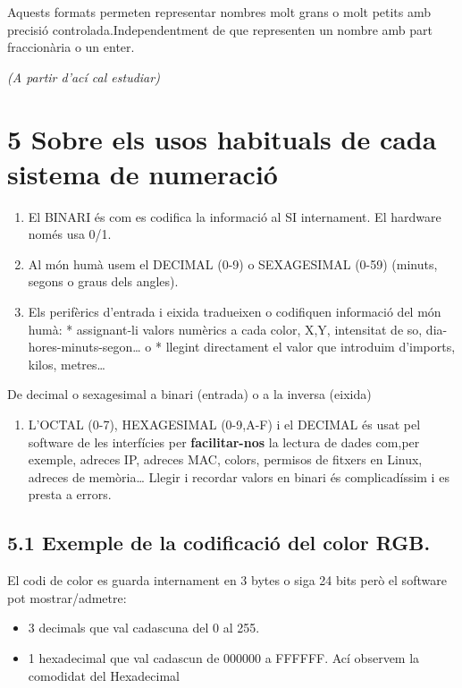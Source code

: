 \documentclass[
  12 pt,
  a4paper,
]{article}
\providecommand{\tightlist}{%
  \setlength{\itemsep}{0pt}\setlength{\parskip}{0pt}}
\begin{document}
Aquests formats permeten representar nombres molt grans o molt petits
amb precisió controlada.Independentment de que representen un nombre amb
part fraccionària o un enter.

\emph{(A partir d'ací cal estudiar)}

\section{5 Sobre els usos habituals de cada sistema de
numeració}\label{sobre-els-usos-habituals-de-cada-sistema-de-numeraciuxf3}

\begin{enumerate}
\def\labelenumi{\arabic{enumi}.}
\item
  El BINARI és com es codifica la informació al SI internament. El
  hardware només usa 0/1.
\item
  Al món humà usem el DECIMAL (0-9) o SEXAGESIMAL (0-59) (minuts, segons
  o graus dels angles).
\item
  Els perifèrics d'entrada i eixida tradueixen o codifiquen informació
  del món humà: * assignant-li valors numèrics a cada color, X,Y,
  intensitat de so, dia-hores-minuts-segon\ldots{} o * llegint
  directament el valor que introduim d'imports, kilos, metres\ldots{}
\end{enumerate}

De decimal o sexagesimal a binari (entrada) o a la inversa (eixida)

\begin{enumerate}
\def\labelenumi{\arabic{enumi}.}
\setcounter{enumi}{3}
\tightlist
\item
  L'OCTAL (0-7), HEXAGESIMAL (0-9,A-F) i el DECIMAL és usat pel software
  de les interfícies per \textbf{facilitar-nos} la lectura de dades
  com,per exemple, adreces IP, adreces MAC, colors, permisos de fitxers
  en Linux, adreces de memòria\ldots{} Llegir i recordar valors en
  binari és complicadíssim i es presta a errors.
\end{enumerate}

\subsection{5.1 Exemple de la codificació del color
RGB.}\label{exemple-de-la-codificaciuxf3-del-color-rgb.}

El codi de color es guarda internament en 3 bytes o siga 24 bits però el
software pot mostrar/admetre:

\begin{itemize}
\tightlist
\item
  3 decimals que val cadascuna del 0 al 255.
\item
  1 hexadecimal que val cadascun de 000000 a FFFFFF. Ací observem la
  comodidat del Hexadecimal
\end{itemize}
\end{document}
